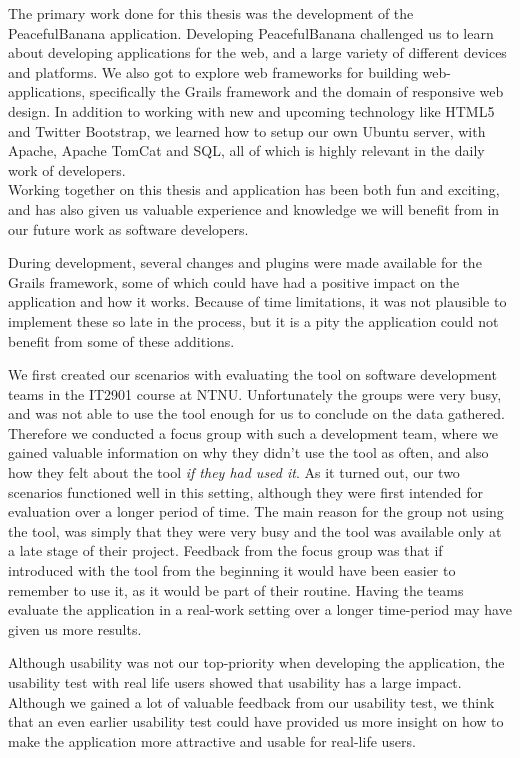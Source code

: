 The primary work done for this thesis was the development of the PeacefulBanana application. Developing PeacefulBanana challenged us to learn about developing applications for the web, and a large variety of different devices and platforms. We also got to explore web frameworks for building web-applications, specifically the Grails framework and the domain of responsive web design. In addition to working with new and upcoming technology like HTML5 and Twitter Bootstrap, we learned how to setup our own Ubuntu server, with Apache, Apache TomCat and SQL, all of which is highly relevant in the daily work of developers.\\
Working together on this thesis and application has been both fun and exciting, and has also given us valuable experience and knowledge we will benefit from in our future work as software developers.

During development, several changes and plugins were made available for the Grails framework, some of which could have had a positive impact on the application and how it works. Because of time limitations, it was not plausible to implement these so late in the process, but it is a pity the application could not benefit from some of these additions. 

We first created our scenarios with evaluating the tool on software development teams in the IT2901 course at NTNU. Unfortunately the groups were very busy, and was not able to use the tool enough for us to conclude on the data gathered. Therefore we conducted a focus group with such a development team, where we gained valuable information on why they didn't use the tool as often, and also how they felt about the tool \emph{if they had used it}. As it turned out, our two scenarios functioned well in this setting, although they were first intended for evaluation over a longer period of time. The main reason for the group not using the tool, was simply that they were very busy and the tool was available only at a late stage of their project. Feedback from the focus group was that if introduced with the tool from the beginning it would have been easier to remember to use it, as it would be part of their routine. Having the teams evaluate the application in a real-work setting over a longer time-period may have given us more results. 

Although usability was not our top-priority when developing the application, the usability test with real life users showed that usability has a large impact. Although we gained a lot of valuable feedback from our usability test, we think that an even earlier usability test could have provided us more insight on how to make the application more attractive and usable for real-life users. 

